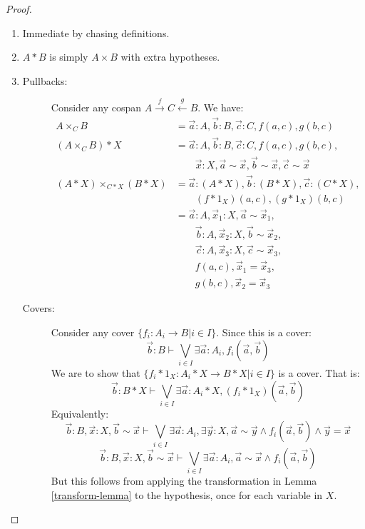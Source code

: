 \documentclass{article}
\begin{document}
\begin{proof}\leavevmode
    \begin{enumerate}
        \item Immediate by chasing definitions.
        \item \(A*B\) is simply \(A \times B\) with extra hypotheses.
        \item \begin{description}
            \item[Pullbacks:] Consider any cospan \(A \xrightarrow{f} C \xleftarrow{g} B\). We have:
            \begin{align*}
                A \times_C B &= \vec{a} : A, \vec{b} : B, \vec{c} : C, f(a,c), g(b,c)
                \\ (A \times_C B) * X &= \vec{a} : A, \vec{b} : B, \vec{c} : C, f(a,c), g(b,c),
                \\ &\qquad \vec{x} : X, \vec{a} \sim \vec{x}, \vec{b} \sim \vec{x}, \vec{c} \sim \vec{x}
                \\ (A*X) \times_{C*X} (B*X) &= \vec{a} : (A*X), \vec{b} : (B*X), \vec{c} : (C*X),
                \\ &\qquad (f*1_X)(a,c), (g*1_X)(b,c)
                \\ &= \vec{a} : A, \vec{x}_1 : X, \vec{a} \sim \vec{x}_1,
                \\ &\qquad \vec{b} : A, \vec{x}_2 : X, \vec{b} \sim \vec{x}_2,
                \\ &\qquad \vec{c} : A, \vec{x}_3 : X, \vec{c} \sim \vec{x}_3,
                \\ &\qquad f(a,c), \vec{x}_1 = \vec{x}_3,
                \\ &\qquad g(b,c), \vec{x}_2 = \vec{x}_3
            \end{align*}
            \item[Covers:] Consider any cover \(\{f_i : A_i \to B | i \in I\}\).
            Since this is a cover:
            \[\vec{b} : B \vdash \bigvee_{i \in I} \exists \vec{a} : A_i, f_i(\vec{a},\vec{b})\]
            We are to show that \(\{f_i*1_X : A_i*X \to B*X | i \in I\}\) is a cover. That is:
            \[\vec{b} : B*X \vdash \bigvee_{i \in I} \exists \vec{a} : A_i*X, (f_i*1_X)(\vec{a},\vec{b})\]
            Equivalently:
            \[\vec{b} : B, \vec{x} : X, \vec{b} \sim \vec{x} \vdash \bigvee_{i \in I} \exists \vec{a} : A_i, \exists \vec{y} : X, \vec{a} \sim \vec{y} \land f_i(\vec{a},\vec{b}) \land \vec{y} = \vec{x}\]
            \[\vec{b} : B, \vec{x} : X, \vec{b} \sim \vec{x} \vdash \bigvee_{i \in I} \exists \vec{a} : A_i, \vec{a} \sim \vec{x} \land f_i(\vec{a},\vec{b})\]
            But this follows from applying the transformation in Lemma \ref{transform-lemma} to the hypothesis, once for each variable in \(X\).
        \end{description}
    \end{enumerate}
\end{proof}
\end{document}
